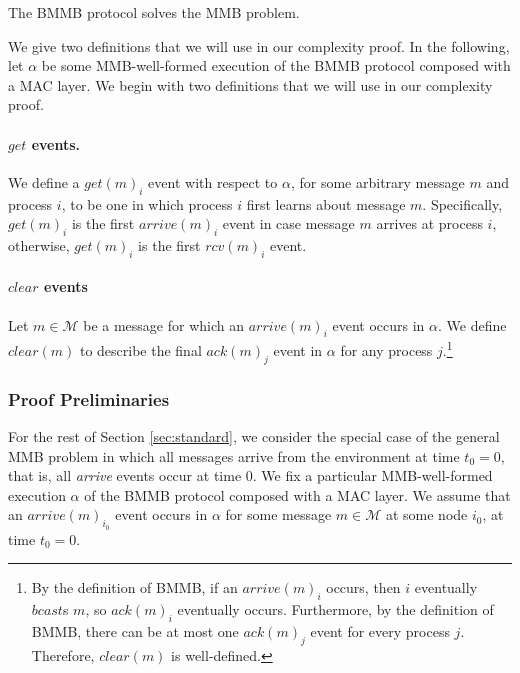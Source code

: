 \begin{theorem}
The BMMB protocol solves the MMB problem.
\label{thm:bmmb}
\end{theorem}

We give two definitions that we will use in our complexity proof.
In the following, let $\alpha$ be some MMB-well-formed
execution of the BMMB protocol composed with a MAC layer.
We begin with two definitions that we will use in our complexity proof.

\paragraph{$get$ events.}
We define a $get(m)_i$ event with respect to $\alpha$,
for some arbitrary message $m$ and process $i$,
to be one in which process $i$ first learns about message $m$.
Specifically, $get(m)_i$ is the first $arrive(m)_i$ event
in case message $m$ arrives at
process $i$,
otherwise, $get(m)_i$ is the first $rcv(m)_i$ event.

\paragraph{$clear$ events}
Let $m\in\mathcal{M}$ be a message for which an $arrive(m)_i$ event
occurs in $\alpha$.  We define $clear(m)$ to describe the final
$ack(m)_j$ event in $\alpha$ for any process $j$.\footnote{
  By the definition of BMMB, if an $arrive(m)_i$ occurs, then $i$
  eventually $bcast$s $m$, so $ack(m)_i$ eventually occurs. Furthermore,
  by the definition of BMMB, there can be at most one $ack(m)_j$ event for
  every process $j$. Therefore, $clear(m)$ is well-defined.}



\subsubsection{Proof Preliminaries}
\label{subsec:Proof Prelim}

For the rest of Section \ref{sec:standard}, we consider the special case of the general MMB problem
in which all messages arrive from the environment at time $t_0 = 0$, that is, all {\em arrive} events occur at time 0.
We fix a particular MMB-well-formed execution $\alpha$ of the BMMB protocol composed with a MAC layer.
We assume that an $arrive(m)_{i_0}$ event occurs in $\alpha$ for
some message $m \in \mathcal{M}$ at some node $i_0$, at time $t_0=0$.

